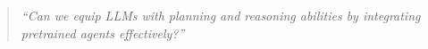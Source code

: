 \documentclass{article}
\theoremstyle{plain}
\theoremstyle{definition}
\theoremstyle{remark}
\begin{document}
\begin{quote}
    {\fontsize{9.5pt}{8pt}\selectfont\textit{``Can we equip LLMs with planning and reasoning abilities by integrating pretrained agents effectively?''}}
\end{quote}

\end{document}
